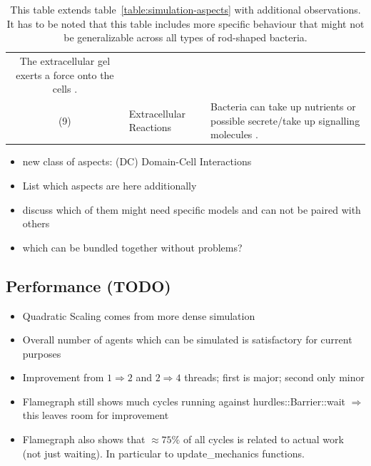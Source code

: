 \documentclass{article}
\begin{document}
\begin{table}[H]
\begin{tabularx}{\textwidth}{c l X}
            The extracellular gel exerts a force onto the cells \cite{Grant2014}.\\
        (9) & Extracellular Reactions &
            Bacteria can take up nutrients or possible secrete/take up signalling molecules
            \cite{Li2025}.\\
        \bottomrule
    \end{tabularx}
    \label{table:simulation-aspects-supplement}
    \caption{
        This table extends table~\ref{table:simulation-aspects} with additional observations.
        It has to be noted that this table includes more specific behaviour that might not be
        generalizable across all types of rod-shaped bacteria.
    }
\end{table}

\begin{itemize}
    \item new class of aspects: (DC) Domain-Cell Interactions
    \item List which aspects are here additionally
    \item discuss which of them might need specific models and can not be paired with others
    \item which can be bundled together without problems?
\end{itemize}

\subsection{Performance (TODO)}
\label{section:supplement-performance}

\begin{itemize}
    \item Quadratic Scaling comes from more dense simulation
    \item Overall number of agents which can be simulated is satisfactory for current purposes
    \item Improvement from $1 \Rightarrow 2$ and $2\Rightarrow4$ threads; first is major; second
        only minor
    \item Flamegraph still shows much cycles running against hurdles::Barrier::wait $\Rightarrow$
        this leaves room for improvement
    \item Flamegraph also shows that $\approx 75\%$ of all cycles is related to actual work (not
        just waiting).
        In particular to update\_mechanics functions.
\end{itemize}
\end{document}

